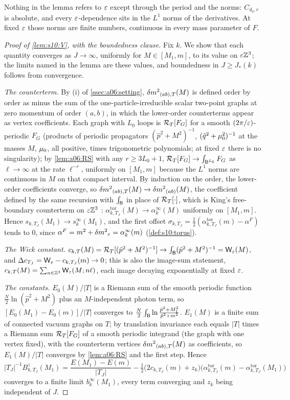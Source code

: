 Nothing in the lemma refers to $\varepsilon$ except through the period and the norms: $C_{d_0,r}$ is absolute, and every $\varepsilon$-dependence sits in the $L^1$ norms of the derivatives. At fixed $\varepsilon$ those norms are finite numbers, continuous in every mass parameter of $F$.

\begin{proof}[Proof of \cref{lem:s10:V}, with the boundedness clause]
Fix $k$. We show that each quantity converges as $J\to\infty$, uniformly for $M\in[M_1,m]$, to its value on $\varepsilon\mathbb Z^3$; the limits named in the lemma are these values, and boundedness in $J\ge J_*(k)$ follows from convergence.

\emph{The counterterm.} By (i) of \cref{ssec:a06:setting}, ${\delta m^2}_{(ab),T}(M)$ is defined order by order as minus the sum of the one-particle-irreducible scalar two-point graphs at zero momentum of order $(a,b)$, in which the lower-order counterterms appear as vertex coefficients. Each graph with $L_0$ loops is $\mathcal R_{T}[F_G]$ for a smooth $(2\pi/\varepsilon)$-periodic $F_G$ (products of periodic propagators $(\hat p^2+M^2)^{-1}$, $(\hat q^2+\mu_0^2)^{-1}$ at the masses $M$, $\mu_0$, all positive, times trigonometric polynomials; at fixed $\varepsilon$ there is no singularity); by \cref{lem:a06:RS} with any $r\ge3L_0+1$, $\mathcal R_{T}[F_G]\to\int_{\mathsf B^{L_0}}F_G$ as $\ell\to\infty$ at the rate $\ell^{-r}$, uniformly on $[M_1,m]$ because the $L^1$ norms are continuous in $M$ on that compact interval. By induction on the order, the lower-order coefficients converge, so ${\delta m^2}_{(ab),T}(M)\to{\ensuremath{\delta m^2}}_{(ab)}(M)$, the coefficient defined by the same recursion with $\int_{\mathsf B}$ in place of $\mathcal R_{T}[\cdot]$, which is King's free-boundary counterterm on $\varepsilon\mathbb Z^3$ \cite[p.~330]{K2}: $\alpha^{\mathrm{tor}}_{k,T_J}(M)\to\alpha^\infty_k(M)$ uniformly on $[M_1,m]$. Hence $s_{k,T_J}(M_1)\to s^\infty_k(M_1)$, and the first offset $\sigma_{k,T_J}=\frac12(\alpha^{\mathrm{tor}}_{k,T_J}(m)-\alpha^F)$ tends to $0$, since $\alpha^F=m^2+{\delta m^2}_{\varepsilon}=\alpha^\infty_k(m)$ (\cref{def:s10:torus}).

\emph{The Wick constant.} $c_{k,T}(M)=\mathcal R_{T}[(\hat p^2+M^2)^{-1}]\to\int_{\mathsf B}(\hat p^2+M^2)^{-1}=\mathsf W_{\varepsilon}(M)$, and $\Delta c_{T_J}=\mathsf W_{\varepsilon}-c_{k,T_J}(m)\to0$; this is also the image-sum statement, $c_{k,T}(M)=\sum_{n\in\mathbb Z^3}\mathsf W_{\varepsilon}(M;n\ell)$, each image decaying exponentially at fixed $\varepsilon$.

\emph{The constants.} $E_0(M)/|T|$ is a Riemann sum of the smooth periodic function $\frac N2\ln(\hat p^2+M^2)$ plus an $M$-independent photon term, so $[E_0(M_1)-E_0(m)]/|T|$ converges to $\frac N2\int_{\mathsf B}\ln\frac{\hat p^2+M_1^2}{\hat p^2+m^2}$. $E_1(M)$ is a finite sum of connected vacuum graphs on $T$; by translation invariance each equals $|T|$ times a Riemann sum $\mathcal R_{T}[F_G]$ of a smooth periodic integrand (the graph with one vertex fixed), with the counterterm vertices ${\delta m^2}_{(ab),T}(M)$ as coefficients, so $E_1(M)/|T|$ converges by \cref{lem:a06:RS} and the first step. Hence
\[
|T_J|^{-1}B^z_{k,T_J}(M_1)=\frac{E(M_1)-E(m)}{|T_J|}-\tfrac12\big(2c_{k,T_J}(m)+z_k\big)\big(\alpha^{\mathrm{tor}}_{k,T_J}(m)-\alpha^{\mathrm{tor}}_{k,T_J}(M_1)\big)
\]
converges to a finite limit $b^\infty_k(M_1)$, every term converging and $z_k$ being independent of $J$.
\end{proof}

